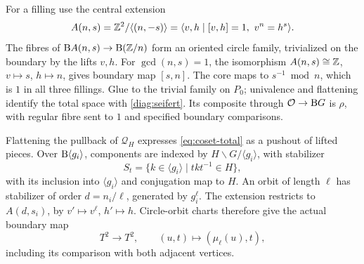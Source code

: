 For a filling use the central extension
\[
A(n,s)=\mathbb Z^2/\langle(n,-s)\rangle
 =\langle v,h\mid [v,h]=1,\ v^n=h^s\rangle.
\]
The fibres of $\mathrm B A(n,s)\to\mathrm B(\mathbb Z/n)$ form an oriented circle family, trivialized on the boundary by the lifts $v,h$. For $\gcd(n,s)=1$, the isomorphism $A(n,s)\cong\mathbb Z$, $v\mapsto s$, $h\mapsto n$, gives boundary map $[s,n]$. The core maps to $s^{-1}\bmod n$, which is $1$ in all three fillings. Glue to the trivial family on $P_0$; univalence and flattening identify the total space with \eqref{diag:seifert}. Its composite through $\mathcal O\to\mathrm B G$ is $\rho$, with regular fibre sent to $1$ and specified boundary comparisons.

Flattening the pullback of $\mathcal Q_H$ expresses \eqref{eq:coset-total} as a pushout of lifted pieces. Over $\mathrm B\langle g_i\rangle$, components are indexed by $H\backslash G/\langle g_i\rangle$, with stabilizer
\[
S_t=\{k\in\langle g_i\rangle\mid tkt^{-1}\in H\},
\]
with its inclusion into $\langle g_i\rangle$ and conjugation map to $H$. An orbit of length $\ell$ has stabilizer of order $d=n_i/\ell$, generated by $g_i^\ell$. The extension restricts to $A(d,s_i)$, by $v'\mapsto v^\ell$, $h'\mapsto h$. Circle-orbit charts therefore give the actual boundary map
\begin{equation}\label{eq:boundary-cover}
T^2\longrightarrow T^2,\qquad (u,t)\longmapsto(\mu_\ell(u),t),
\end{equation}
including its comparison with both adjacent vertices.

